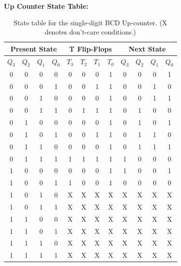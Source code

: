 \documentclass[12pt]{article}
\begin{document}
\textbf{Up Counter State Table:}
\begin{table}[H]
\centering
\begin{tabular}{|c|c|c|c||c|c|c|c||c|c|c|c|}
\hline
\multicolumn{4}{|c||}{Present State} & \multicolumn{4}{c||}{T Flip-Flops} & \multicolumn{4}{c|}{Next State} \\
\hline
\(Q_3\) & \(Q_2\) & \(Q_1\) & \(Q_0\) & \(T_3\) & \(T_2\) & \(T_1\) & \(T_0\) & \(Q_3\) & \(Q_2\) & \(Q_1\) & \(Q_0\) \\
\hline
0 & 0 & 0 & 0 & 0 & 0 & 0 & 1 & 0 & 0 & 0 & 1 \\
\hline
0 & 0 & 0 & 1 & 0 & 0 & 1 & 1 & 0 & 0 & 1 & 0 \\
\hline
0 & 0 & 1 & 0 & 0 & 0 & 0 & 1 & 0 & 0 & 1 & 1 \\
\hline
0 & 0 & 1 & 1 & 0 & 1 & 1 & 1 & 0 & 1 & 0 & 0 \\
\hline
0 & 1 & 0 & 0 & 0 & 0 & 0 & 1 & 0 & 1 & 0 & 1 \\
\hline
0 & 1 & 0 & 1 & 0 & 0 & 1 & 1 & 0 & 1 & 1 & 0 \\
\hline
0 & 1 & 1 & 0 & 0 & 0 & 0 & 1 & 0 & 1 & 1 & 1 \\
\hline
0 & 1 & 1 & 1 & 1 & 1 & 1 & 1 & 1 & 0 & 0 & 0 \\
\hline
1 & 0 & 0 & 0 & 0 & 0 & 0 & 1 & 1 & 0 & 0 & 1 \\
\hline
1 & 0 & 0 & 1 & 1 & 0 & 0 & 1 & 0 & 0 & 0 & 0 \\
\hline
1 & 0 & 1 & 0 & X & X & X & X & X & X & X & X \\
\hline
1 & 0 & 1 & 1 & X & X & X & X & X & X & X & X \\
\hline
1 & 1 & 0 & 0 & X & X & X & X & X & X & X & X \\
\hline
1 & 1 & 0 & 1 & X & X & X & X & X & X & X & X \\
\hline
1 & 1 & 1 & 0 & X & X & X & X & X & X & X & X \\
\hline
1 & 1 & 1 & 1 & X & X & X & X & X & X & X & X \\
\hline
\end{tabular}
\caption{State table for the single-digit BCD Up-counter. (X denotes don't-care conditions.)}
\end{table}
\end{document}

